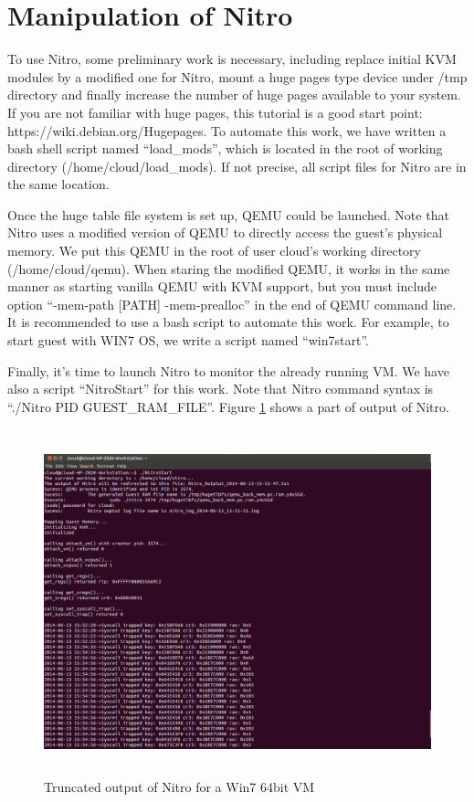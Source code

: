 
\section{Manipulation of Nitro}

To use Nitro, some preliminary work is necessary, including replace initial KVM modules by a modified one for Nitro, 
mount a huge pages type device under /tmp directory and finally increase the number of huge pages available to your system. 
If you are not familiar with huge pages, this tutorial is a good start point: https://wiki.debian.org/Hugepages. 
To automate this work, we have written a bash shell script named “load\_mods”, which is located in the root of working directory (/home/cloud/load\_mods). 
If not precise, all script files for Nitro are in the same location. 

Once the huge table file system is set up, QEMU could be launched. 
Note that Nitro uses a modified version of QEMU to directly access the guest's physical memory. 
We put this QEMU in the root of user cloud’s working directory (/home/cloud/qemu). 
When staring the modified QEMU, it works in the same manner as starting vanilla QEMU with KVM support, 
but you must include option “-mem-path [PATH] -mem-prealloc” in the end of QEMU command line. 
It is recommended to use a bash script to automate this work. For example, to start guest with WIN7 OS, 
we write a script named “win7start”.

Finally, it’s time to launch Nitro to monitor the already running VM. We have also a script “NitroStart” for this work. 
Note that Nitro command syntax is “./Nitro PID GUEST\_RAM\_FILE”. Figure \ref{fig:Truncated output of Nitro for a Win7 64bit VM} shows a part of output of Nitro.

\begin{figure}[htbp]
	\centering
		\includegraphics[width=14cm, height= 10cm ]{Figures/Figure19.png}
	\caption[Truncated output of Nitro for a Win7 64bit VM]{Truncated output of Nitro for a Win7 64bit VM}
	\label{fig:Truncated output of Nitro for a Win7 64bit VM}
\end{figure}

